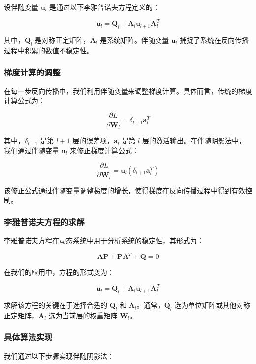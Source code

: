 \documentclass[12pt,a4paper]{amsart}
\begin{document}
设伴随变量 \( \mathbf{u}_l \) 是通过以下李雅普诺夫方程定义的：

\[ \mathbf{u}_l = \mathbf{Q}_l + \mathbf{A}_l \mathbf{u}_{l+1} \mathbf{A}_l^T \]

其中，\( \mathbf{Q}_l \) 是对称正定矩阵，\( \mathbf{A}_l \) 是系统矩阵。伴随变量 \( \mathbf{u}_l \) 捕捉了系统在反向传播过程中积累的数值不稳定性。

\subsubsection{梯度计算的调整}

在每一步反向传播中，我们利用伴随变量来调整梯度计算。具体而言，传统的梯度计算公式为：

\[ \frac{\partial L}{\partial \mathbf{W}_l} = \delta_{l+1} \mathbf{a}_l^T \]

其中，\( \delta_{l+1} \) 是第 \( l+1 \) 层的误差项，\( \mathbf{a}_l \) 是第 \( l \) 层的激活输出。在伴随阴影法中，我们通过伴随变量 \( \mathbf{u}_l \) 来修正梯度计算公式：

\[ \frac{\partial L}{\partial \mathbf{W}_l} = \mathbf{u}_l (\delta_{l+1} \mathbf{a}_l^T) \]

该修正公式通过伴随变量调整梯度的增长，使得梯度在反向传播过程中得到有效控制。

\subsubsection{李雅普诺夫方程的求解}

李雅普诺夫方程在动态系统中用于分析系统的稳定性，其形式为：

\[ \mathbf{A} \mathbf{P} + \mathbf{P} \mathbf{A}^T + \mathbf{Q} = 0 \]

在我们的应用中，方程的形式变为：

\[ \mathbf{u}_l = \mathbf{Q}_l + \mathbf{A}_l \mathbf{u}_{l+1} \mathbf{A}_l^T \]

求解该方程的关键在于选择合适的 \( \mathbf{Q}_l \) 和 \( \mathbf{A}_l \)。通常，\( \mathbf{Q}_l \) 选为单位矩阵或其他对称正定矩阵，\( \mathbf{A}_l \) 选为当前层的权重矩阵 \( \mathbf{W}_l \)。

\subsubsection{具体算法实现}

我们通过以下步骤实现伴随阴影法：
\end{document}
